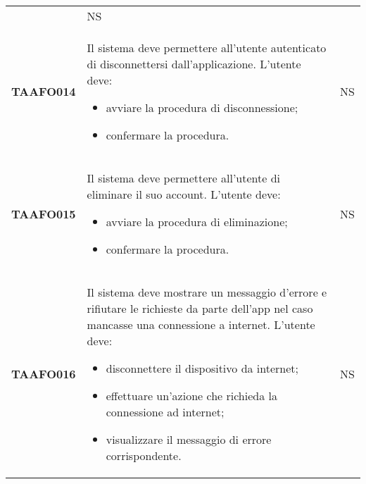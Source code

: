 \documentclass[../piano-di-qualifica.tex]{subfiles}
\begin{document}
\begin{longtable}[H]{>{\centering\bfseries}m{3cm} >{}m{11cm} >{\centering\arraybackslash}m{2cm}}
                                  & NS                                                                                                                                                                                                                                   \\
  TAAFO014                        & Il sistema deve permettere all’utente autenticato di disconnettersi dall’applicazione. \newline
  L’utente deve:
  \begin{itemize}
    \item avviare la procedura di disconnessione;
    \item confermare la procedura.
  \end{itemize}
                                  & NS                                                                                                                                                                                                                                   \\
  TAAFO015                        & Il sistema deve permettere all’utente di eliminare il suo account. \newline
  L’utente deve:
  \begin{itemize}
    \item avviare la procedura di eliminazione;
    \item confermare la procedura.
  \end{itemize}
                                  & NS                                                                                                                                                                                                                                   \\
  TAAFO016                        & Il sistema deve mostrare un messaggio d’errore e rifiutare le richieste da parte dell’app nel caso mancasse una connessione a internet. \newline
  L’utente deve:
  \begin{itemize}
    \item disconnettere il dispositivo da internet;
    \item effettuare un'azione che richieda la connessione ad internet;
    \item visualizzare il messaggio di errore corrispondente.
  \end{itemize}
                                  & NS                                                                                                                                                                                                                                   \\

\end{longtable}
\end{document}
